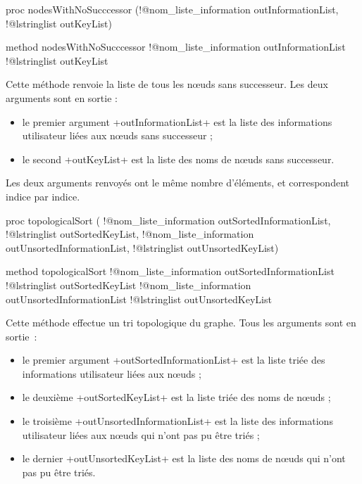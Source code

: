 \begin{galgas4}
proc nodesWithNoSucccessor (!@nom_liste_information outInformationList,
                          !@lstringlist outKeyList)
\end{galgas4}

\begin{galgas4}
method nodesWithNoSucccessor !@nom_liste_information outInformationList
                           !@lstringlist outKeyList
\end{galgas4}

Cette méthode renvoie la liste de tous les nœuds sans successeur. Les deux arguments sont en sortie :
\begin{itemize}
  \item le premier argument \ggsq+outInformationList+ est la liste des informations utilisateur liées aux nœuds sans successeur ;
  \item le second \ggsq+outKeyList+ est la liste des noms de nœuds sans successeur.
\end{itemize}

Les deux arguments renvoyés ont le même nombre d'éléments, et correspondent indice par indice.






\begin{galgas4}
proc topologicalSort (
  !@nom_liste_information outSortedInformationList,
  !@lstringlist outSortedKeyList,
  !@nom_liste_information outUnsortedInformationList,
  !@lstringlist outUnsortedKeyList)
\end{galgas4}

\begin{galgas4}
method topologicalSort
  !@nom_liste_information outSortedInformationList
  !@lstringlist outSortedKeyList
  !@nom_liste_information outUnsortedInformationList
  !@lstringlist outUnsortedKeyList
\end{galgas4}

Cette méthode effectue un tri topologique du graphe. Tous les arguments sont en sortie~:
\begin{itemize}
  \item le premier argument \ggsq+outSortedInformationList+ est la liste triée des informations utilisateur liées aux nœuds ;
  \item le deuxième \ggsq+outSortedKeyList+ est la liste triée des noms de nœuds ;
  \item le troisième \ggsq+outUnsortedInformationList+ est la liste des informations utilisateur liées aux nœuds qui n'ont pas pu être triés ;
  \item le dernier \ggsq+outUnsortedKeyList+ est la liste des noms de nœuds qui n'ont pas pu être triés.
\end{itemize}

